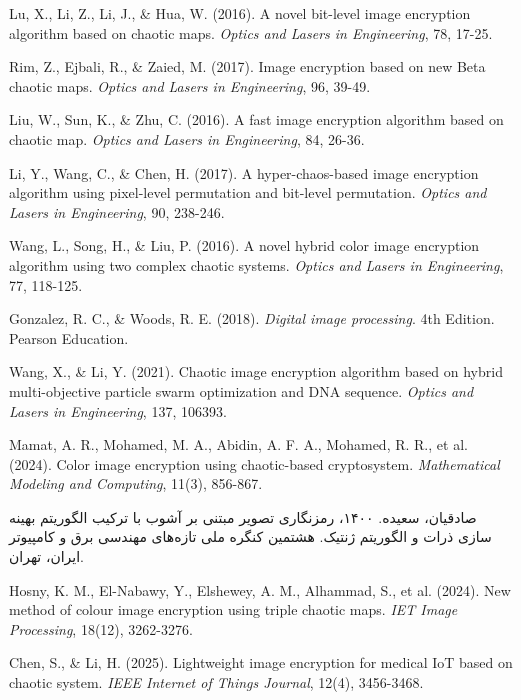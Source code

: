  Lu, X., Li, Z., Li, J., \& Hua, W. (2016). A novel bit-level image encryption algorithm based on chaotic maps. \textit{Optics and Lasers in Engineering}, 78, 17-25.



 Rim, Z., Ejbali, R., \& Zaied, M. (2017). Image encryption based on new Beta chaotic maps. \textit{Optics and Lasers in Engineering}, 96, 39-49.



 Liu, W., Sun, K., \& Zhu, C. (2016). A fast image encryption algorithm based on chaotic map. \textit{Optics and Lasers in Engineering}, 84, 26-36.



 Li, Y., Wang, C., \& Chen, H. (2017). A hyper-chaos-based image encryption algorithm using pixel-level permutation and bit-level permutation. \textit{Optics and Lasers in Engineering}, 90, 238-246.



 Wang, L., Song, H., \& Liu, P. (2016). A novel hybrid color image encryption algorithm using two complex chaotic systems. \textit{Optics and Lasers in Engineering}, 77, 118-125.



 Gonzalez, R. C., \& Woods, R. E. (2018). \textit{Digital image processing}. 4th Edition. Pearson Education.



 Wang, X., \& Li, Y. (2021). Chaotic image encryption algorithm based on hybrid multi-objective particle swarm optimization and DNA sequence. \textit{Optics and Lasers in Engineering}, 137, 106393.



 Mamat, A. R., Mohamed, M. A., Abidin, A. F. A., Mohamed, R. R., et al. (2024). Color image encryption using chaotic-based cryptosystem. \textit{Mathematical Modeling and Computing}, 11(3), 856-867.


 صادقیان، سعیده. ۱۴۰۰، رمزنگاری تصویر مبتنی بر آشوب با ترکیب الگوریتم بهینه سازی ذرات و الگوریتم ژنتیک. هشتمین کنگره ملی تازه‌های مهندسی برق و کامپیوتر ایران، تهران.


 Hosny, K. M., El-Nabawy, Y., Elshewey, A. M., Alhammad, S., et al. (2024). New method of colour image encryption using triple chaotic maps. \textit{IET Image Processing}, 18(12), 3262-3276.



 Chen, S., \& Li, H. (2025). Lightweight image encryption for medical IoT based on chaotic system. \textit{IEEE Internet of Things Journal}, 12(4), 3456-3468.



